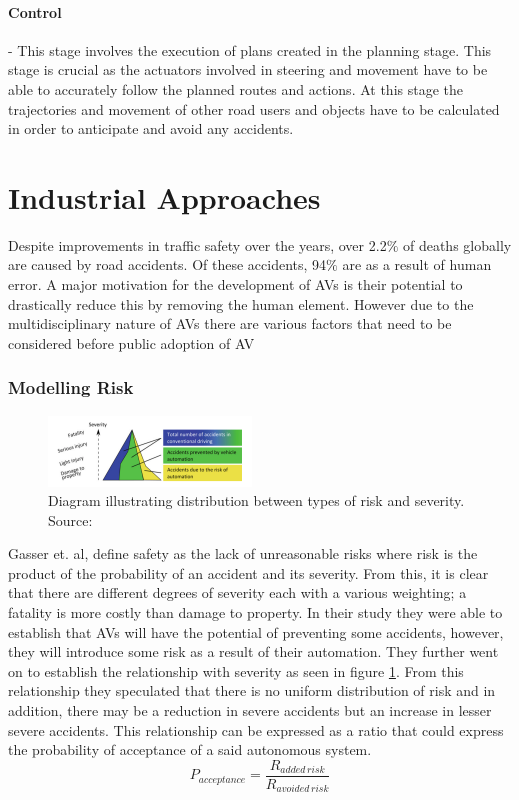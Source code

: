\paragraph{Control} - This stage involves the execution of plans created in the planning stage. This stage is crucial as the actuators involved in steering and movement have to be able to accurately follow the planned routes and actions. At this stage the trajectories and movement of other road users and objects have to be calculated in order to anticipate and avoid any accidents. 
	

\section{Industrial Approaches}
Despite improvements in traffic safety over the years, over  2.2$\%$ of deaths globally are caused by road accidents. Of these accidents, 94$\%$ are as a result of human error. A major motivation for the development of AVs is their potential to drastically reduce this by removing the human element. However due to the multidisciplinary nature of AVs there are various factors that need to be considered before public adoption of AV

\subsubsection{Modelling Risk}
\begin{figure}
	\centering
	\includegraphics[width=0.48\textwidth]{images/risk}
	\caption{Diagram illustrating distribution between types of risk and severity. Source:\cite{gasser2016fundamental}}
	\label{fig:riskrel}
\end{figure}
Gasser et. al\cite{gasser2016fundamental}, define safety as the lack of unreasonable risks where risk is the product of the probability of an accident and its severity. From this, it is clear that there are different degrees of severity each with a various weighting; a fatality is more costly than damage to property. In their study they were able to establish that AVs will have the potential of preventing some accidents, however, they will introduce some risk as a result of their automation. They further went on to establish the relationship with severity as seen in figure \ref{fig:riskrel}. From this relationship they speculated that there is no uniform distribution of risk and in addition, there may be a reduction in severe accidents but an increase in lesser severe accidents. 
This relationship can be expressed as a ratio that could express the probability of  acceptance of a said autonomous system. 
\begin{equation*}
	P_{acceptance} = \frac{R_{added\, risk}}{R_{avoided\, risk}}
\end{equation*}

